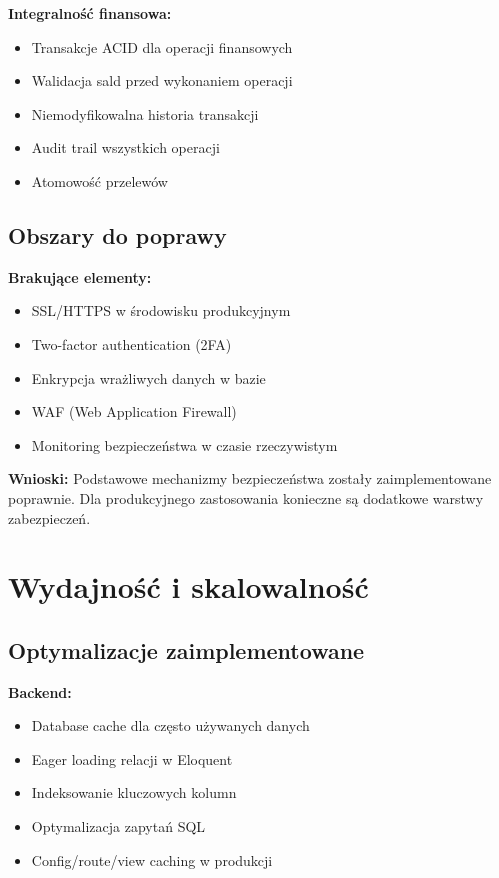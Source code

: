 \documentclass[12pt,a4paper]{article}
\begin{document}
    \textbf{Integralność finansowa:}
    \begin{itemize}
        \item Transakcje ACID dla operacji finansowych
        \item Walidacja sald przed wykonaniem operacji
        \item Niemodyfikowalna historia transakcji
        \item Audit trail wszystkich operacji
        \item Atomowość przelewów
    \end{itemize}

    \subsection{Obszary do poprawy}

    \textbf{Brakujące elementy:}
    \begin{itemize}
        \item SSL/HTTPS w środowisku produkcyjnym
        \item Two-factor authentication (2FA)
        \item Enkrypcja wrażliwych danych w bazie
        \item WAF (Web Application Firewall)
        \item Monitoring bezpieczeństwa w czasie rzeczywistym
    \end{itemize}

    \textbf{Wnioski:} Podstawowe mechanizmy bezpieczeństwa zostały zaimplementowane poprawnie. Dla produkcyjnego zastosowania konieczne są dodatkowe warstwy zabezpieczeń.

    \section{Wydajność i skalowalność}

    \subsection{Optymalizacje zaimplementowane}

    \textbf{Backend:}
    \begin{itemize}
        \item Database cache dla często używanych danych
        \item Eager loading relacji w Eloquent
        \item Indeksowanie kluczowych kolumn
        \item Optymalizacja zapytań SQL
        \item Config/route/view caching w produkcji
    \end{itemize}
\end{document}
